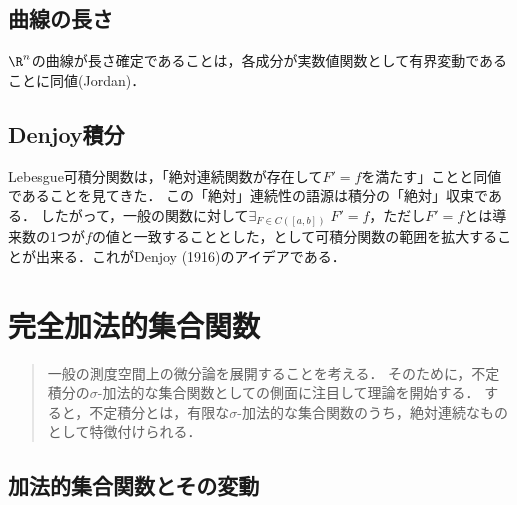 \documentclass[uplatex, dvipdfmx]{jsreport}
\begin{document}
\section{曲線の長さ}

\begin{tcolorbox}[colframe=ForestGreen, colback=ForestGreen!10!white,breakable,colbacktitle=ForestGreen!40!white,coltitle=black,fonttitle=\bfseries\sffamily,
title=]
    $\R^n$の曲線が長さ確定であることは，各成分が実数値関数として有界変動であることに同値(Jordan)．
\end{tcolorbox}

\section{Denjoy積分}

\begin{tcolorbox}[colframe=ForestGreen, colback=ForestGreen!10!white,breakable,colbacktitle=ForestGreen!40!white,coltitle=black,fonttitle=\bfseries\sffamily,
title=]
    Lebesgue可積分関数は，「絶対連続関数が存在して$F'=f$を満たす」ことと同値であることを見てきた．
    この「絶対」連続性の語源は積分の「絶対」収束である．
    したがって，一般の関数に対して$\exists_{F\in C([a,b])}\;F'=f$，ただし$F'=f$とは導来数の1つが$f$の値と一致することとした，として可積分関数の範囲を拡大することが出来る．これがDenjoy (1916)のアイデアである．
\end{tcolorbox}

\chapter{完全加法的集合関数}

\begin{quotation}
    一般の測度空間上の微分論を展開することを考える．
    そのために，不定積分の$\sigma$-加法的な集合関数としての側面に注目して理論を開始する．
    すると，不定積分とは，有限な$\sigma$-加法的な集合関数のうち，絶対連続なものとして特徴付けられる．
\end{quotation}

\section{加法的集合関数とその変動}
\end{document}
